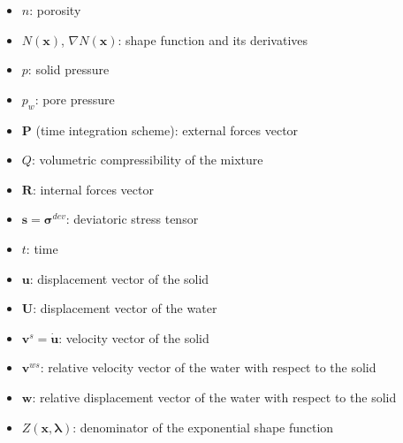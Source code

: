 \documentclass[twocolumn]{svjour3}          %
\begin{document}
\begin{itemize}
\item $n$: porosity
\item $N(\boldsymbol{x})$, $\nabla N(\boldsymbol{x})$: shape function and its derivatives
\item $p$: solid pressure
\item $p_w$: pore pressure
\item $\boldsymbol{P}$ (time integration scheme): external forces vector
\item $Q$: volumetric compressibility of the mixture
\item $\boldsymbol{R}$: internal forces vector
\item $\boldsymbol{s}=\boldsymbol{\sigma}^{dev}$: deviatoric stress tensor
\item $t$: time
\item $\boldsymbol{u}$: displacement vector of the solid
\item $\boldsymbol{U}$: displacement vector of the water
\item $\boldsymbol{v}^s=\boldsymbol{\dot{u}}$: velocity vector of the solid
\item $\boldsymbol{v}^{ws}$: relative velocity vector of the water with respect to the solid
\item $\boldsymbol{w}$: relative displacement vector of the water with respect to the solid
\item $Z(\boldsymbol{x},\boldsymbol{\lambda})$: denominator of the exponential shape function


\end{itemize}
\end{document}
